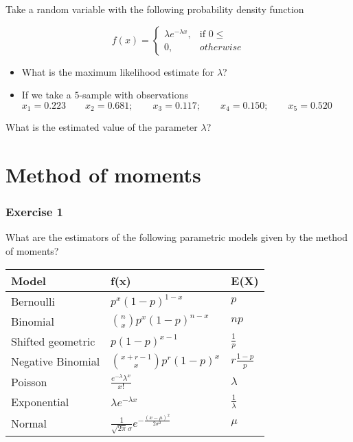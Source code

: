 \documentclass[
]{book}
\begin{document}
Take a random variable with the following probability density function

\[
    f(x)= 
\begin{cases}
    \lambda e^{-\lambda x},& \text{if } 0 \leq\\
    0,& otherwise 
\end{cases}
\]

\begin{itemize}
\item
  What is the maximum likelihood estimate for \(\lambda\)?
\item
  If we take a \(5\)-sample with observations
  \(x_1 = 0.223 \qquad x_2 = 0.681; \qquad x_3 = 0.117; \qquad x_4 = 0.150; \qquad x_5 = 0.520\)
\end{itemize}

What is the estimated value of the parameter \(\lambda\)?

\hypertarget{method-of-moments}{%
\section{Method of moments}\label{method-of-moments}}

\hypertarget{exercise-1-8}{%
\subsubsection{Exercise 1}\label{exercise-1-8}}

What are the estimators of the following parametric models given by the method of moments?

\begin{longtable}[]{@{}lll@{}}
\toprule
Model & f(x) & E(X) \\
\midrule
\endhead
Bernoulli & \(p^x(1-p)^{1-x}\) & \(p\) \\
Binomial & \(\binom n x p^x(1-p)^{n-x}\) & \(np\) \\
Shifted geometric & \(p(1-p)^{x-1}\) & \(\frac{1}{p}\) \\
Negative Binomial & \(\binom {x+r-1} x p^r(1-p)^x\) & \(r\frac{1-p}{p}\) \\
Poisson & \(\frac{e^{-\lambda}\lambda^x}{x!}\) & \(\lambda\) \\
Exponential & \(\lambda e^{-\lambda x}\) & \(\frac{1}{\lambda}\) \\
Normal & \(\frac{1}{\sqrt{2\pi}\sigma}e^{-\frac{(x-\mu)^2}{2\sigma^2}}\) & \(\mu\) \\
\bottomrule
\end{longtable}
\end{document}
